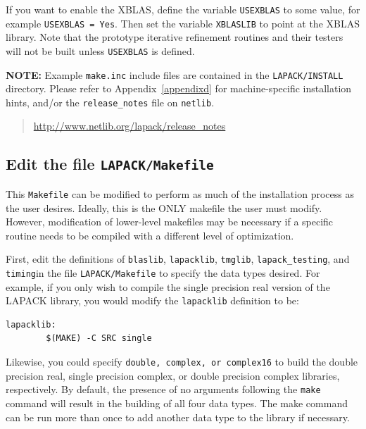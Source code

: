 \documentclass[11pt]{report}
\begin{document}
If you want to enable the XBLAS, define the variable \texttt{USEXBLAS}
to some value, for example \texttt{USEXBLAS = Yes}.  Then set the
variable \texttt{XBLASLIB} to point at the XBLAS library.  Note that
the prototype iterative refinement routines and their testers will not
be built unless \texttt{USEXBLAS} is defined.

\textbf{NOTE:}  Example \texttt{make.inc} include files are contained in the
\texttt{LAPACK/INSTALL} directory.  Please refer to
Appendix~\ref{appendixd} for machine-specific installation hints, and/or
the \texttt{release\_notes} file on \texttt{netlib}.
\begin{quote}
\url{http://www.netlib.org/lapack/release\_notes}
\end{quote}

\subsection{Edit the file \texttt{LAPACK/Makefile}}\label{toplevelmakefile}

This \texttt{Makefile} can be modified to perform as much of the
installation process as the user desires.  Ideally, this is the ONLY
makefile the user must modify.  However, modification of lower-level
makefiles may be necessary if a specific routine needs to be compiled
with a different level of optimization.

First, edit the definitions of \texttt{blaslib}, \texttt{lapacklib},
\texttt{tmglib}, \texttt{lapack\_testing}, and \texttt{timing}\footnotemark[\value{footnote}] in the file \texttt{LAPACK/Makefile}
to specify the data types desired.  For example,
if you only wish to compile the single precision real version of the
LAPACK library, you would modify the \texttt{lapacklib} definition to be:

\begin{verbatim}
lapacklib:
        $(MAKE) -C SRC single
\end{verbatim}

Likewise, you could specify \texttt{double, complex, or complex16} to
build the double precision real, single precision complex, or double
precision complex libraries, respectively.  By default, the presence of
no arguments following the \texttt{make} command will result in the
building of all four data types.
The make command can be run more than once to add another
data type to the library if necessary.

\end{document}
